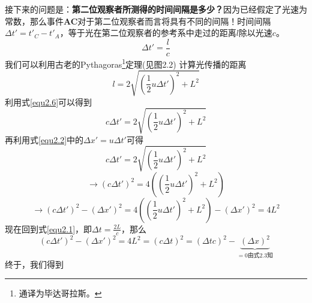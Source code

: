 接下来的问题是：{\bf{第二位观察者所测得的时间间隔是多少？}}因为已经假定了光速为常数，那么事件{\bf{AC}}对于第二位观察者而言将具有不同的间隔！时间间隔$\Delta t'=t'_C-t'_A$，等于光在第二位观察者的参考系中走过的距离$l$除以光速$c$。
\begin{equation}\label{equ2.6}
  \Delta t'=\frac{l}{c}
\end{equation}
我们可以利用古老的Pythagoras\footnote{通译为毕达哥拉斯。}定理(见图2.2) 计算光传播的距离
\begin{equation}\label{equ2.7}
  l=2 \sqrt{\left(\frac{1}{2} u \Delta t'\right)^2+L^2}
\end{equation}
利用式\eqref{equ2.6}可以得到
\begin{equation}\label{equ2.8}
  c \Delta t' =2 \sqrt{\left(\frac{1}{2} u \Delta t'\right)^2+L^2}
\end{equation}
再利用式\eqref{equ2.2}中的$\Delta x'=u\Delta t'$可得
\begin{displaymath}
c \Delta t' =
  2 \sqrt{\left(\frac{1}{2} u \Delta t'\right)^2+L^2}
\end{displaymath}
\begin{displaymath}
  \rightarrow
  \left( c \Delta t' \right)^2 =
   4 \left( \left(\frac{1}{2} u \Delta t'\right)^2+L^2 \right)
\end{displaymath}
\begin{equation}\label{equ2.9}
\rightarrow
\left( c \Delta t' \right)^2
-\left(\Delta x' \right)^2=
4 \left( \left(\frac{1}{2} u \Delta t'\right)^2+L^2 \right)
-\left(\Delta x' \right)^2 =4L^2
\end{equation}
 现在回到式\eqref{equ2.1}，即$\Delta t =\frac{2L}{c}$，那么
\begin{equation}\label{equ2.10}
 \left( c \Delta t' \right)^2
 -\left(\Delta x' \right)^2
 =4 L^2
 =\left( c \Delta t \right)^2
 =\left( \Delta t c \right)^2
 -
 \!\!\!
 \underbrace{\left(\Delta x \right)^2}_{=0 \text{由式}2.3 \text{知}}
\end{equation}
终于，我们得到

